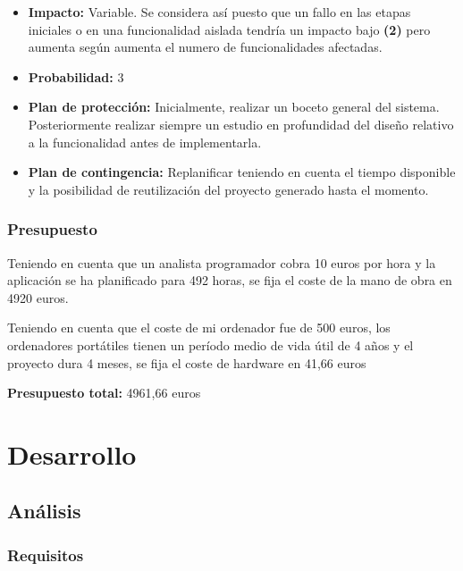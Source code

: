 \documentclass[openright,twoside,10pt]{book}
\providecommand{\tightlist}{%
  \setlength{\itemsep}{0pt}\setlength{\parskip}{0pt}}
\begin{document}
\begin{itemize}
      \begin{itemize}
      \tightlist
      \item
        \textbf{Impacto:} Variable. Se considera así puesto que un fallo en
        las etapas iniciales o en una funcionalidad aislada tendría un
        impacto bajo \textbf{(2)} pero aumenta según aumenta el numero de
        funcionalidades afectadas.
      \item
        \textbf{Probabilidad:} 3
      \item
        \textbf{Plan de protección:} Inicialmente, realizar un boceto
        general del sistema. Posteriormente realizar siempre un estudio en
        profundidad del diseño relativo a la funcionalidad antes de
        implementarla.
      \item
        \textbf{Plan de contingencia:} Replanificar teniendo en cuenta el
        tiempo disponible y la posibilidad de reutilización del proyecto
        generado hasta el momento.
      \end{itemize}
    \end{itemize}
    
    \subsection{Presupuesto}\label{presupuesto}
    
    Teniendo en cuenta que un analista programador cobra 10 euros por hora y
    la aplicación se ha planificado para 492 horas, se fija el coste de la
    mano de obra en 4920 euros.
    
    Teniendo en cuenta que el coste de mi ordenador fue de 500 euros, los
    ordenadores portátiles tienen un período medio de vida útil de 4 años y
    el proyecto dura 4 meses, se fija el coste de hardware en 41,66 euros
    
    \textbf{Presupuesto total:} 4961,66 euros
    
    \chapter{ Desarrollo }
    
    \section{Análisis}\label{anuxe1lisis}
    
    \subsection{Requisitos}\label{requisitos}
    
\end{document}
